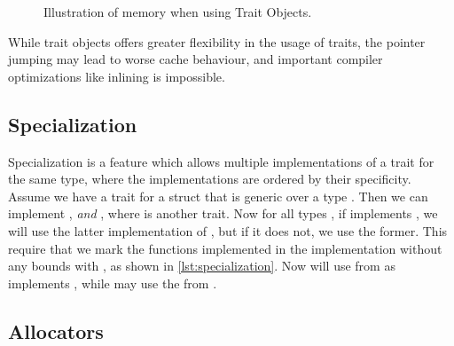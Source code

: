 \begin{figure}[ht]
  \centering
  
  \caption{Illustration of memory when using Trait Objects.\label{fig:trait-objects}}
\end{figure}

While trait objects offers greater flexibility in the usage of traits, the pointer jumping may lead
to worse cache behaviour, and important compiler optimizations like inlining is impossible.



\subsection{Specialization\label{sec:specialization}}

Specialization is a feature which allows multiple implementations of a trait for the same type,
where the implementations are ordered by their specificity. Assume we have a trait  for a
struct that is generic over a type . Then we can implement ,
\emph{and} , where  is another trait. Now for all types
, if  implements , we will use the latter implementation of , but
if it does not, we use the former. This require that we mark the functions implemented in the
implementation without any bounds with , as shown in \cref{lst:specialization}. Now
 will use  from  as  implements
, while  may use the  from .






\subsection{Allocators\label{sec:allocators}}
\lorem{}
